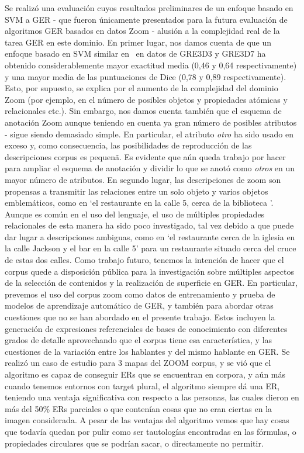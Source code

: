 Se realiz\'o una evaluaci\'on cuyos resultados preliminares de un enfoque basado en SVM a GER - que fueron \'unicamente presentados para la futura evaluaci\'on de algoritmos GER basados en datos Zoom - alusi\'on a la complejidad real de la tarea GER en este dominio.
En primer lugar, nos damos cuenta de que un enfoque basado en SVM similar en~\cite{thiago-svm} en datos de GRE3D3 y GRE3D7 ha obtenido considerablemente mayor exactitud media (0,46 y 0,64 respectivamente) y una mayor media de las puntuaciones de Dice (0,78 y 0,89 respectivamente). Esto, por supuesto, se explica por el aumento de la complejidad del dominio Zoom (por ejemplo, en el n\'umero de posibles objetos y propiedades at\'omicas y relacionales etc.). 
Sin embargo, nos damos cuenta tambi\'en que el esquema de anotaci\'on Zoom  aunque teniendo en cuenta ya gran n\'umero de posibles atributos - sigue siendo demasiado simple. En particular, el atributo {\em otro} ha sido usado en exceso y, como consecuencia, las posibilidades de reproducci\'on de las descripciones corpus es pequen\~a. Es evidente que a\'un queda trabajo por hacer para ampliar el esquema de anotaci\'on y dividir lo que se anot\'o como {\em otros} en un mayor n\'umero de atributos.
En segundo lugar, las descripciones de zoom son propensas a transmitir las relaciones entre un solo objeto y varios objetos emblem\'aticos, como en `el restaurante en la calle 5, cerca de la biblioteca '. Aunque es com\'un en el uso del lenguaje, el uso de m\'ultiples propiedades relacionales de esta manera ha sido poco investigado, tal vez debido a que puede dar lugar a descripciones ambiguas, como en `el restaurante cerca de la iglesia en la calle Jackson y el bar en la calle 5' para un restaurante situado cerca del cruce de estas dos calles.
Como trabajo futuro, tenemos la intenci\'on de hacer que el corpus quede a disposici\'on p\'ublica para la investigaci\'on sobre m\'ultiples aspectos de la selecci\'on de contenidos y la realizaci\'on de superficie en GER. En particular, prevemos el uso del corpus zoom como datos de entrenamiento y prueba de modelos de aprendizaje autom\'atico de GER, y tambi\'en para abordar otras cuestiones que no se han abordado en el presente trabajo. Estos incluyen la generaci\'on de expresiones referenciales de bases de conocimiento con diferentes grados de detalle aprovechando que el corpus tiene esa caracter\'istica, y las cuestiones de la variaci\'on entre los hablantes y del mismo hablante en GER.
Se realiz\'o un caso de estudio para 3 mapas del ZOOM corpus, y se vi\'o que el algoritmo es capaz de conseguir ERs que se encuentran en corpora, y a\'un m\'as cuando tenemos entornos con target plural, el algoritmo siempre d\'a una ER, teniendo una ventaja significativa con respecto a las personas, las cuales dieron en m\'as del 50\% ERs parciales o que conten\'ian cosas que no eran ciertas en la imagen considerada. A pesar de las ventajas del algoritmo vemos que hay cosas que todav\'ia quedan por pulir como ser tautolog\'ias encontradas en las f\'ormulas, o propiedades circulares que se podr\'ian sacar, o directamente no permitir.

 

